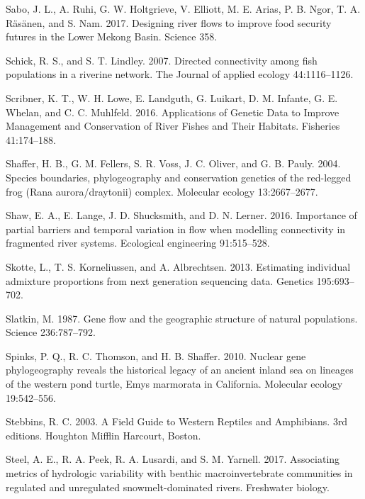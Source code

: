 \documentclass[proquest,12pt,final]{ucthesis-CA2012} %
\begin{document}
\begin{ucmainmatter}
\leavevmode\hypertarget{ref-sabo_designing_2017}{}%
Sabo, J. L., A. Ruhi, G. W. Holtgrieve, V. Elliott, M. E. Arias, P. B.
Ngor, T. A. Räsänen, and S. Nam. 2017. Designing river flows to improve
food security futures in the Lower Mekong Basin. Science 358.

\leavevmode\hypertarget{ref-schick_directed_2007}{}%
Schick, R. S., and S. T. Lindley. 2007. Directed connectivity among fish
populations in a riverine network. The Journal of applied ecology
44:1116--1126.

\leavevmode\hypertarget{ref-scribner_applications_2016}{}%
Scribner, K. T., W. H. Lowe, E. Landguth, G. Luikart, D. M. Infante, G.
E. Whelan, and C. C. Muhlfeld. 2016. Applications of Genetic Data to
Improve Management and Conservation of River Fishes and Their Habitats.
Fisheries 41:174--188.

\leavevmode\hypertarget{ref-shaffer_species_2004}{}%
Shaffer, H. B., G. M. Fellers, S. R. Voss, J. C. Oliver, and G. B.
Pauly. 2004. Species boundaries, phylogeography and conservation
genetics of the red-legged frog (Rana aurora/draytonii) complex.
Molecular ecology 13:2667--2677.

\leavevmode\hypertarget{ref-shaw_importance_2016}{}%
Shaw, E. A., E. Lange, J. D. Shucksmith, and D. N. Lerner. 2016.
Importance of partial barriers and temporal variation in flow when
modelling connectivity in fragmented river systems. Ecological
engineering 91:515--528.

\leavevmode\hypertarget{ref-skotte_estimating_2013}{}%
Skotte, L., T. S. Korneliussen, and A. Albrechtsen. 2013. Estimating
individual admixture proportions from next generation sequencing data.
Genetics 195:693--702.

\leavevmode\hypertarget{ref-slatkin_gene_1987}{}%
Slatkin, M. 1987. Gene flow and the geographic structure of natural
populations. Science 236:787--792.

\leavevmode\hypertarget{ref-spinks_nuclear_2010}{}%
Spinks, P. Q., R. C. Thomson, and H. B. Shaffer. 2010. Nuclear gene
phylogeography reveals the historical legacy of an ancient inland sea on
lineages of the western pond turtle, Emys marmorata in California.
Molecular ecology 19:542--556.

\leavevmode\hypertarget{ref-stebbins_field_2003}{}%
Stebbins, R. C. 2003. A Field Guide to Western Reptiles and Amphibians.
3rd editions. Houghton Mifflin Harcourt, Boston.

\leavevmode\hypertarget{ref-steel_associating_2017}{}%
Steel, A. E., R. A. Peek, R. A. Lusardi, and S. M. Yarnell. 2017.
Associating metrics of hydrologic variability with benthic
macroinvertebrate communities in regulated and unregulated
snowmelt-dominated rivers. Freshwater biology.


\end{ucmainmatter}
\end{document}
